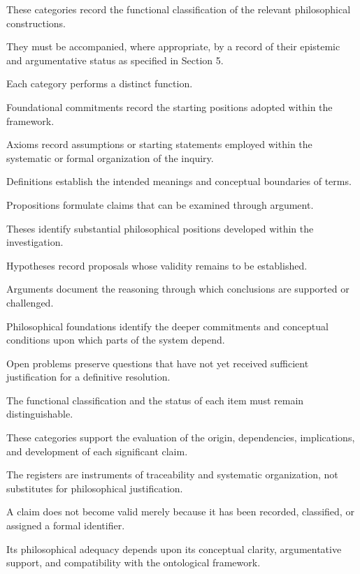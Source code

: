 These categories record the
functional classification of
the relevant philosophical
constructions.

They must be accompanied,
where appropriate, by a record
of their epistemic and argumentative
status as specified in Section 5.

Each category performs a distinct
function.

Foundational commitments record
the starting positions adopted
within the framework.

Axioms record assumptions or
starting statements employed
within the systematic or formal
organization of the inquiry.

Definitions establish the
intended meanings and conceptual
boundaries of terms.

Propositions formulate claims
that can be examined through
argument.

Theses identify substantial
philosophical positions developed
within the investigation.

Hypotheses record proposals
whose validity remains to
be established.

Arguments document the reasoning
through which conclusions
are supported or challenged.

Philosophical foundations identify
the deeper commitments and
conceptual conditions upon
which parts of the system
depend.

Open problems preserve questions
that have not yet received
sufficient justification for
a definitive resolution.

The functional classification
and the status of each item
must remain distinguishable.

These categories support the
evaluation of the origin,
dependencies, implications,
and development of each
significant claim.

The registers are instruments
of traceability and systematic
organization, not substitutes
for philosophical justification.

A claim does not become valid
merely because it has been
recorded, classified, or assigned
a formal identifier.

Its philosophical adequacy
depends upon its conceptual
clarity, argumentative support,
and compatibility with the
ontological framework.


